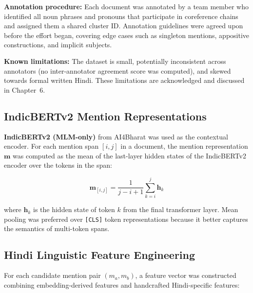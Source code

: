 \documentclass[12pt,a4paper]{report}
\begin{document}
\noindent \textbf{Annotation procedure:} Each document was annotated by a team member who identified all noun phrases and pronouns that participate in coreference chains and assigned them a shared cluster ID. Annotation guidelines were agreed upon before the effort began, covering edge cases such as singleton mentions, appositive constructions, and implicit subjects.

\noindent \textbf{Known limitations:} The dataset is small, potentially inconsistent across annotators (no inter-annotator agreement score was computed), and skewed towards formal written Hindi. These limitations are acknowledged and discussed in Chapter~6.

\subsection{IndicBERTv2 Mention Representations}

\textbf{IndicBERTv2 (MLM-only)} \cite{doddapaneni2023indicbert} from AI4Bharat was used as the contextual encoder. For each mention span $[i, j]$ in a document, the mention representation $\mathbf{m}$ was computed as the mean of the last-layer hidden states of the IndicBERTv2 encoder over the tokens in the span:

\begin{equation}
\mathbf{m}_{[i,j]} = \frac{1}{j - i + 1} \sum_{k=i}^{j} \mathbf{h}_k
\end{equation}

where $\mathbf{h}_k$ is the hidden state of token $k$ from the final transformer layer. Mean pooling was preferred over \texttt{[CLS]} token representations because it better captures the semantics of multi-token spans.

\subsection{Hindi Linguistic Feature Engineering}

For each candidate mention pair $(m_a, m_b)$, a feature vector was constructed combining embedding-derived features and handcrafted Hindi-specific features:
\end{document}
